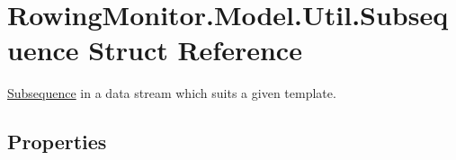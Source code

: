 \hypertarget{struct_rowing_monitor_1_1_model_1_1_util_1_1_subsequence}{}\section{Rowing\+Monitor.\+Model.\+Util.\+Subsequence Struct Reference}
\label{struct_rowing_monitor_1_1_model_1_1_util_1_1_subsequence}


\hyperlink{struct_rowing_monitor_1_1_model_1_1_util_1_1_subsequence}{Subsequence} in a data stream which suits a given template.  


\subsection*{Properties}
